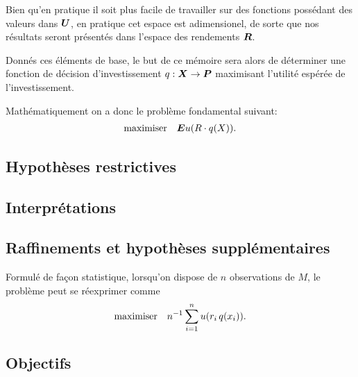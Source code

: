 Bien qu'en pratique il soit plus facile de travailler sur des fonctions possédant des
valeurs dans $\bm{U}$, en pratique cet espace est adimensionel\cit, de sorte que nos résultats
seront présentés dans l'espace des rendements $\bm{R}$.

Donnés ces éléments de base, le but de ce mémoire sera alors de déterminer une fonction de
décision d'investissement $q: \bm{X} \to \bm{P}$ maximisant l'utilité espérée de l'investissement. 

Mathématiquement on a donc le problème fondamental suivant:
\begin{equation}
  \begin{array}{ll}\operatorname*{maximiser} & \displaystyle{\bm Eu(R \cdot q(X)).}\end{array}
\end{equation}

\subsection{Hypothèses restrictives}

\subsection{Interprétations}





\subsection{Raffinements et hypothèses supplémentaires}


Formulé de façon statistique, lorsqu'on dispose de $n$ observations de $M$, le problème
peut se réexprimer comme
\begin{equation}
  \begin{array}{ll}\operatorname*{maximiser} & \displaystyle{n^{-1}\sum_{i=1}^nu(r_i\,q(x_i)).}\end{array}
\end{equation}


\subsection{Objectifs}





